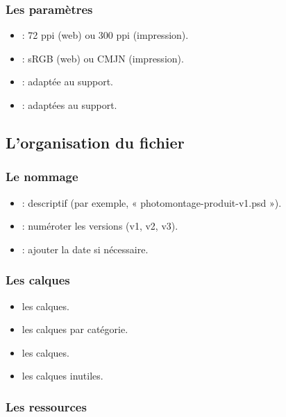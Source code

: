 \subsubsection{Les paramètres}

\begin{itemize}
    \item {} : 72 ppi (web) ou 300 ppi (impression).
    \item {} : sRGB (web) ou CMJN (impression).
    \item {} : adaptée au support.
    \item {} : adaptées au support.
\end{itemize}

\subsection{L'organisation du fichier}

\subsubsection{Le nommage}

\begin{itemize}
    \item {} : descriptif (par exemple, « photomontage-produit-v1.psd »).
    \item {} : numéroter les versions (v1, v2, v3).
    \item {} : ajouter la date si nécessaire.
\end{itemize}

\subsubsection{Les calques}

\begin{itemize}
    \item {} les calques.
    \item {} les calques par catégorie.
    \item {} les calques.
    \item {} les calques inutiles.
\end{itemize}

\subsubsection{Les ressources}

